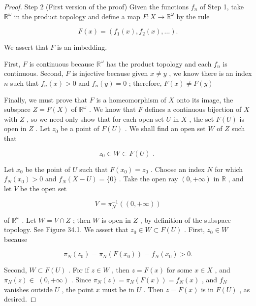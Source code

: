 \begin{proof}
Step 2 (First version of the proof) Given the functions \({f}_{n}\) of Step 1, take \({\mathbb{R}}^{\omega }\) in the product topology and define a map \(F : X \rightarrow  {\mathbb{R}}^{\omega }\) by the rule

\[
F\left( x\right)  = \left( {{f}_{1}\left( x\right) ,{f}_{2}\left( x\right) ,\ldots }\right) .
\]

We assert that \(F\) is an imbedding.

First, \(F\) is continuous because \({\mathbb{R}}^{\omega }\) has the product topology and each \({f}_{n}\) is continuous. Second, \(F\) is injective because given \(x \neq  y\) , we know there is an index \(n\) such that \({f}_{n}\left( x\right)  > 0\) and \({f}_{n}\left( y\right)  = 0\) ; therefore, \(F\left( x\right)  \neq  F\left( y\right)\)

Finally, we must prove that \(F\) is a homeomorphism of \(X\) onto its image, the subspace \(Z = F\left( X\right)\) of \({\mathbb{R}}^{\omega }\) . We know that \(F\) defines a continuous bijection of \(X\) with \(Z\) , so we need only show that for each open set \(U\) in \(X\) , the set \(F\left( U\right)\) is open in \(Z\) . Let \({z}_{0}\) be a point of \(F\left( U\right)\) . We shall find an open set \(W\) of \(Z\) such that

\[
{z}_{0} \in  W \subset  F\left( U\right) \text{ . }
\]

Let \({x}_{0}\) be the point of \(U\) such that \(F\left( {x}_{0}\right)  = {z}_{0}\) . Choose an index \(N\) for which \({f}_{N}\left( {x}_{0}\right)  > 0\) and \({f}_{N}\left( {X - U}\right)  = \{ 0\}\) . Take the open ray \(\left( {0, + \infty }\right)\) in \(\mathbb{R}\) , and let \(V\) be the open set

\[
V = {\pi }_{N}^{-1}\left( \left( {0, + \infty }\right) \right)
\]

of \({\mathbb{R}}^{\omega }\) . Let \(W = V \cap  Z\) ; then \(W\) is open in \(Z\) , by definition of the subspace topology. See Figure 34.1. We assert that \({z}_{0} \in  W \subset  F\left( U\right)\) . First, \({z}_{0} \in  W\) because

\[
{\pi }_{N}\left( {z}_{0}\right)  = {\pi }_{N}\left( {F\left( {x}_{0}\right) }\right)  = {f}_{N}\left( {x}_{0}\right)  > 0.
\]

Second, \(W \subset  F\left( U\right)\) . For if \(z \in  W\) , then \(z = F\left( x\right)\) for some \(x \in  X\) , and \({\pi }_{N}\left( z\right)  \in\)  \(\left( {0, + \infty }\right)\) . Since \({\pi }_{N}\left( z\right)  = {\pi }_{N}\left( {F\left( x\right) }\right)  = {f}_{N}\left( x\right)\) , and \({f}_{N}\) vanishes outside \(U\) , the point \(x\) must be in \(U\) . Then \(z = F\left( x\right)\) is in \(F\left( U\right)\) , as desired.


\end{proof}
